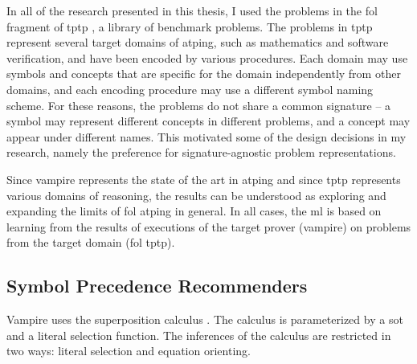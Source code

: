 In all of the research presented in this thesis, I used the problems in the \gls{fol} fragment of \gls{tptp} \cite{Sutcliffe2017}, a library of benchmark problems.
The problems in \gls{tptp} represent several target domains of \gls{atping},
such as mathematics and software verification, and have been encoded by various procedures.
Each domain may use symbols and concepts that are specific for the domain independently from other domains,
and each encoding procedure may use a different symbol naming scheme.
For these reasons, the problems do not share a common \gls{signature} -- a symbol may represent different concepts in different problems, and a concept may appear under different names.
This motivated some of the design decisions in my research, namely the preference for signature-agnostic problem representations.

Since \gls{vampire} represents the state of the art in \gls{atping} \cite{casc-j12,DBLP:journals/aicom/SutcliffeD23}
and since \gls{tptp} represents various domains of reasoning,
the results can be understood as exploring and expanding the limits of \gls{fol} \gls{atping} in general.
In all cases, the \gls{ml} is based on learning from the results of executions of the target prover (\gls{vampire}) on problems from the target domain (\gls{fol} \gls{tptp}).

\subsection{Symbol Precedence Recommenders}
\label{sec:contrib:SymbolPrecedenceRecommenders}

Vampire uses the superposition calculus \cite{DBLP:conf/cav/KovacsV13,DBLP:journals/logcom/BachmairG94}.
The calculus is parameterized by a \gls{sot} and a literal selection function.
The inferences of the calculus are restricted in two ways: literal selection and equation orienting.

